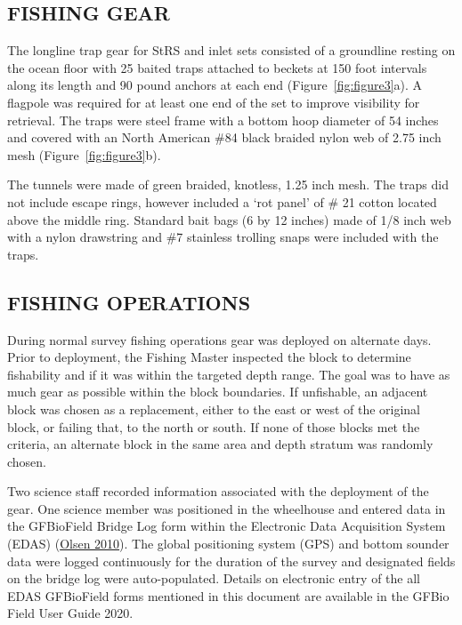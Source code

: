 \documentclass[12pt]{article}\usepackage[]{graphicx}\usepackage[]{color}
\begin{document}
\hypertarget{fishing-gear}{%
\subsection{FISHING GEAR}\label{fishing-gear}}

The longline trap gear for StRS and inlet sets consisted of a groundline resting on the ocean floor with 25 baited traps attached to beckets at 150 foot intervals along its length and 90 pound anchors at each end (Figure~\ref{fig:figure3}a). A flagpole was required for at least one end of the set to improve visibility for retrieval. The traps were steel frame with a bottom hoop diameter of 54 inches and covered with an North American \#84 black braided nylon web of 2.75 inch mesh (Figure~\ref{fig:figure3}b).

The tunnels were made of green braided, knotless, 1.25 inch mesh. The traps did not include escape rings, however included a `rot panel' of \# 21 cotton located above the middle ring. Standard bait bags (6 by 12 inches) made of 1/8 inch web with a nylon drawstring and \#7 stainless trolling snaps were included with the traps.

\hypertarget{fishing-operations}{%
\subsection{FISHING OPERATIONS}\label{fishing-operations}}

During normal survey fishing operations gear was deployed on alternate days. Prior to deployment, the Fishing Master inspected the block to determine fishability and if it was within the targeted depth range. The goal was to have as much gear as possible within the block boundaries. If unfishable, an adjacent block was chosen as a replacement, either to the east or west of the original block, or failing that, to the north or south. If none of those blocks met the criteria, an alternate block in the same area and depth stratum was randomly chosen.

Two science staff recorded information associated with the deployment of the gear. One science member was positioned in the wheelhouse and entered data in the GFBioField Bridge Log form within the Electronic Data Acquisition System (EDAS) (\protect\hyperlink{ref-Olsen2010}{Olsen 2010}). The global positioning system (GPS) and bottom sounder data were logged continuously for the duration of the survey and designated fields on the bridge log were auto-populated. Details on electronic entry of the all EDAS GFBioField forms mentioned in this document are available in the GFBio Field User Guide 2020.
\end{document}
